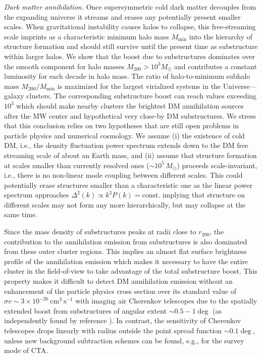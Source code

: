 \documentclass[10pt,aps,pra,reprint,amsmath,amsfonts,amssymb,showpacs,nofootinbib,floatfix]{revtex4-1}
\newcommand{\rmn}{\mathrm}
\newcommand{\msun}{M_\odot}
\newcommand{\rvir}{r_{200}}
\newcommand{\mvir}{M_{200}}
\begin{document}
{\em Dark matter annihilation.} Once supersymmetric cold dark matter
decouples from the expanding universe it streams and erases any
potentially present smaller scales. When gravitational instability
causes halos to collapse, this free-streaming scale imprints as a
characteristic minimum halo mass $M_\mathrm{min}$ into the hierarchy
of structure formation and should still survive until the present time
as substructure within larger halos. We show that the boost due to
substructures dominates over the smooth component for halo masses
$\mvir>10^3 \msun$ and contributes a constant luminosity for each
decade in halo mass. The ratio of halo-to-minimum subhalo mass
$\mvir/M_\mathrm{min}$ is maximized for the largest virialized systems
in the Universe---galaxy clusters. The corresponding substructure
boost can reach values exceeding $10^3$ which should make nearby
clusters the brightest DM annihilation sources after the MW center and
hypothetical very close-by DM substructures. We stress that this
conclusion relies on two hypotheses that are still open problems in
particle physics and numerical cosmology. We assume (i) the existence
of cold DM, i.e., the density fluctuation power spectrum extends down
to the DM free streaming scale of about an Earth mass, and (ii) assume
that structure formation at scales smaller than currently resolved
ones ($\sim 10^5\,\msun$) proceeds scale-invariant, i.e., there is no
non-linear mode coupling between different scales. This could
potentially erase structures smaller than a characteristic one as the
linear power spectrum approaches $\Delta^2(k) \propto k^3
P(k)=\rmn{const.}$ implying that structure on different scales may not
form any more hierarchically, but may collapse at the same time.

Since the mass density of substructures peaks at radii close to
$\rvir$, the contribution to the annihilation emission from
substructures is also dominated from these outer cluster regions.
This implies an almost flat surface brightness profile of the
annihilation emission which makes it necessary to have the entire
cluster in the field-of-view to take advantage of the total
substructure boost. This property makes it difficult to detect DM
annihilation emission without an enhancement of the particle physics
cross section over its standard value of $\sigma v\sim 3\times
10^{-26} ~\mathrm{cm}^3~\mathrm{s}^{-1}$ with imaging air Cherenkov
telescopes due to the spatially extended boost from substructures of
angular extent $\sim 0.5-1\deg$ (as independently found by reference
\cite{2011arXiv1104.3530S}). In contrast, the sensitivity of Cherenkov
telescopes drops linearly with radius outside the point spread
function $\sim 0.1\deg$, unless new background subtraction schemes can
be found, e.g., for the survey mode of CTA.
\end{document}
